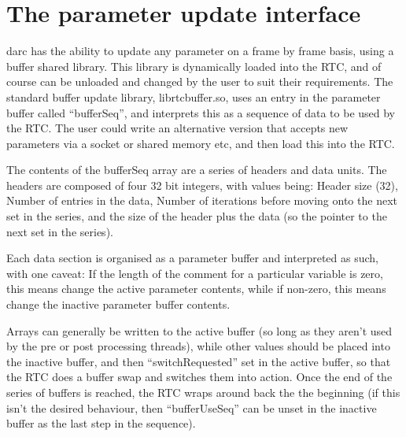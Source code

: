 \documentclass[a4,10pt]{article}
\newcommand{\ignore}[1]{}
\begin{document}
\ignore{
\subsection{nodestream.py}
A process which receives telemetry data for one particular stream from
darc and writes it to a local shared memory circular buffer.  This
buffer can then be accessed by lots of clients without consuming more
network bandwidth.

nodestream.py NAME [PREFIX]
}



\section{The parameter update interface}
darc has the ability to update any parameter on a frame by frame
basis, using a buffer shared library.  This library is dynamically
loaded into the RTC, and of course can be unloaded and changed by the
user to suit their requirements.  The standard buffer update library,
librtcbuffer.so, uses an entry in the parameter buffer called
``bufferSeq'', and interprets this as a sequence of data to be used by
the RTC.  The user could write an alternative version that accepts new
parameters via a socket or shared memory etc, and then load this into
the RTC.

The contents of the bufferSeq array are a series of headers and data
units.  The headers are composed of four 32 bit integers, with values
being: Header size (32), Number of entries in the data, Number of
iterations before moving onto the next set in the series, and the size
of the header plus the data (so the pointer to the next set in the
series).

Each data section is organised as a parameter buffer and interpreted
as such, with one caveat:  If the length of the comment for a
particular variable is zero, this means change the active parameter
contents, while if non-zero, this means change the inactive parameter
buffer contents.

Arrays can generally be written to the active buffer (so long as they
aren't used by the pre or post processing threads), while other values
should be placed into the inactive buffer, and then
``switchRequested'' set in the active buffer, so that the RTC does a
buffer swap and switches them into action.  Once the end of the series
of buffers is reached, the RTC wraps around back the the beginning (if
this isn't the desired behaviour, then ``bufferUseSeq'' can be unset
in the inactive buffer as the last step in the sequence).  
\end{document}

